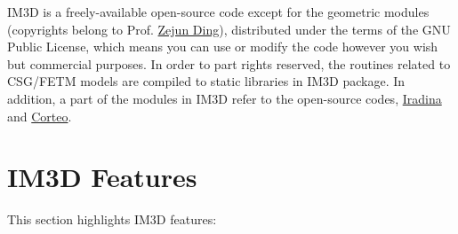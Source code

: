 
IM3D is a freely-available open-source code except for the geometric modules (copyrights belong to Prof. \href{http://micro.ustc.edu.cn/Members/zjding.htm}{Zejun Ding}), distributed under the terms of the GNU Public License, which means you can use or modify the code however you wish but commercial purposes. In order to part rights reserved, the routines related to CSG/FETM models are compiled to static libraries in IM3D package. In addition, a part of the modules in IM3D refer to the open-source codes, \href{http://www.nano.uni-jena.de/Forschung/Physik+mit+Ionenstrahlen/iradina-p-103.html}{Iradina}\cite{Borschel:2011} and \href{http://www.lps.umontreal.ca/~schiette/index.php?n=Recherche.Corteo}{Corteo}\cite{Schiettekatte:2008}.




\section{IM3D Features}

This section highlights IM3D features: %


